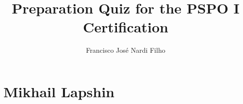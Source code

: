 \documentclass[a4paper,11pt]{article}
\begin{document}
\title{\bf{Preparation Quiz for the PSPO I Certification}}
\author{Francisco Jos\'e Nardi Filho}
\maketitle

\tableofcontents
\newpage
\section{Mikhail Lapshin}


\end{document}
